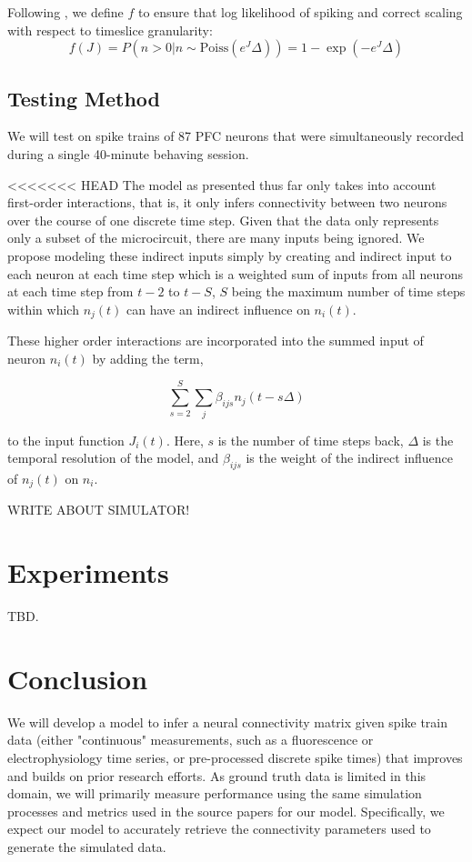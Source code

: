 \documentclass{article}
\begin{document}
Following \citep{mishchencko2011}, we define $f$ to ensure that log likelihood of 
spiking and correct scaling with respect to timeslice granularity: \begin{equation}
\label{f} f(J) = P\left(n>0 | n \sim \text{Poiss}(e^J\Delta)\right) = 1 - \exp(-e^J\Delta) \end{equation}

\subsection{Testing Method}
We will test on spike trains of 87 PFC neurons that were simultaneously recorded during a single 40-minute behaving session.

<<<<<<< HEAD
The model as presented thus far only takes into account first-order interactions, that is, it only infers connectivity between two neurons over the course of one discrete time step. Given that the data only represents only a subset of the microcircuit, there are many inputs being ignored. We propose modeling these indirect inputs simply by creating and indirect input to each neuron at each time step which is a weighted sum of inputs from all neurons at each time step from $t-2$ to $t-S$, $S$ being the maximum number of time steps within which $n_j(t)$ can have an indirect influence on $n_i(t)$.

These higher order interactions are incorporated into the summed input of neuron $n_i(t)$ by adding the term,


\begin{equation}
\label{new_term}
\displaystyle\sum\limits_{s=2}^S\sum\limits_{j} \beta_{ijs}n_j(t-s\Delta)
\end{equation}


to the input function $J_i(t)$. Here, $s$ is the number of time steps back, $\Delta$ is the temporal resolution of the model, and $\beta_{ijs}$ is the weight of the indirect influence of $n_j(t)$ on $n_i$.

WRITE ABOUT SIMULATOR!
\section{Experiments}
TBD.

\section{Conclusion}
We will develop a model to infer a neural connectivity matrix given spike train data (either "continuous" measurements, such as a fluorescence or electrophysiology time series, or pre-processed discrete spike times) that improves and builds on prior research efforts. As ground truth data is limited in this domain, we will primarily measure performance using the same simulation processes and metrics used in the source papers for our model.  Specifically, we expect our model to accurately retrieve the connectivity parameters used to generate the simulated data.  
\end{document}
